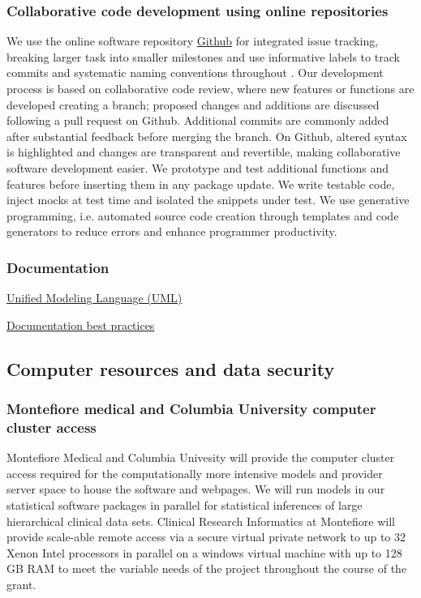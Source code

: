 \documentclass[11pt,notitlepage]{article}
\begin{document}
\subsubsection*{Collaborative code development using online repositories }
We use the online software repository \href{https://github.com/}{Github} for integrated issue tracking, breaking larger task into smaller milestones and use informative labels to track commits and systematic naming conventions throughout \cite{loeliger2012version}. Our development process is based on collaborative code review, where new features or functions are developed creating a branch; proposed changes and additions are discussed following a pull request on Github. Additional commits are commonly added after substantial feedback before merging the branch.  On Github, altered syntax is highlighted and changes are transparent and revertible, making collaborative software development easier. We prototype and test additional functions and features before inserting them in any package update. We write testable code, inject mocks at test time and isolated the snippets under test. We use generative programming, i.e. automated source code creation through templates and code generators to reduce errors and enhance programmer productivity.

\subsubsection*{Documentation}
\href{https://en.wikipedia.org/wiki/Unified_Modeling_Language}{Unified Modeling Language (UML)}

\href{https://dzone.com/articles/10-software-documentation-best}{Documentation best practices}

\subsection*{Computer resources and data security}
\subsubsection*{Montefiore medical and Columbia University computer cluster access}
Montefiore Medical and Columbia Univesity will provide the computer cluster access required for the computationally more intensive models and provider server space to house the software and webpages. We will run models in our statistical software packages in parallel for statistical inferences of large hierarchical clinical data sets. Clinical Research Informatics at Montefiore will provide scale-able remote access via a secure virtual private network to up to 32 Xenon Intel processors in parallel on a windows virtual machine with up to 128 GB RAM to meet the variable needs of the project throughout the course of the grant. 
\end{document}
